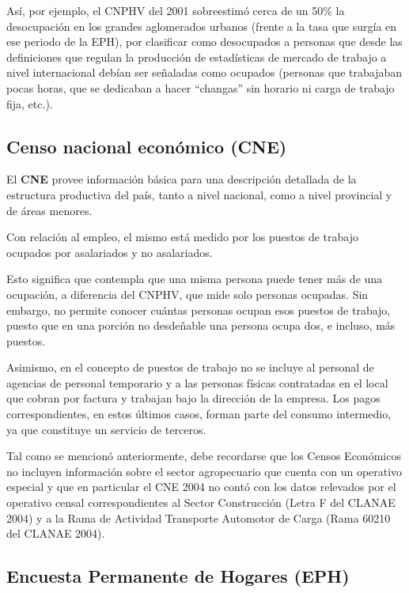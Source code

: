 \documentclass[
  openany]{book}
\begin{document}
Así, por ejemplo, el CNPHV del 2001 sobreestimó cerca de un 50\% la desocupación en los grandes aglomerados urbanos (frente a la tasa que surgía en ese periodo de la EPH), por clasificar como desocupados a personas que desde las definiciones que regulan la producción de estadísticas de mercado de trabajo a nivel internacional debían ser señaladas como ocupados (personas que trabajaban pocas horas, que se dedicaban a hacer ``changas'' sin horario ni carga de trabajo fija, etc.).

\hypertarget{censo-nacional-econuxf3mico-cne-1}{%
\subsection{Censo nacional económico (CNE)}\label{censo-nacional-econuxf3mico-cne-1}}

El \textbf{CNE} provee información básica para una descripción detallada de la estructura productiva del país, tanto a nivel nacional, como a nivel provincial y de áreas menores.

Con relación al empleo, el mismo está medido por los puestos de trabajo ocupados por asalariados y no asalariados.

Esto significa que contempla que una misma persona puede tener más de una ocupación, a diferencia del CNPHV, que mide solo personas ocupadas. Sin embargo, no permite conocer cuántas personas ocupan esos puestos de trabajo, puesto que en una porción no desdeñable una persona ocupa dos, e incluso, más puestos.

Asimismo, en el concepto de puestos de trabajo no se incluye al personal de agencias de personal temporario y a las personas físicas contratadas en el local que cobran por factura y trabajan bajo la dirección de la empresa. Los pagos correspondientes, en estos últimos casos, forman parte del consumo intermedio, ya que constituye un servicio de terceros.

Tal como se mencionó anteriormente, debe recordarse que los Censos Económicos no incluyen información sobre el sector agropecuario que cuenta con un operativo especial y que en particular el CNE 2004 no contó con los datos relevados por el operativo censal correspondientes al Sector Construcción (Letra F del CLANAE 2004) y a la Rama de Actividad Transporte Automotor de Carga (Rama 60210 del CLANAE 2004).

\hypertarget{encuesta-permanente-de-hogares-eph}{%
\subsection{Encuesta Permanente de Hogares (EPH)}\label{encuesta-permanente-de-hogares-eph}}
\end{document}
